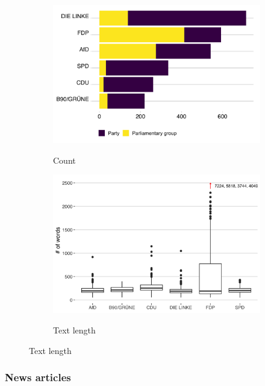 \documentclass[12pt,a4paper,notitlepage]{article}
\begin{document}
\begin{figure}[H]
	\begin{center}
	\caption{Press releases}
		\begin{subfigure}[normla]{0.39\textwidth}
			\caption{Count}
			\includegraphics[width=\textwidth]{../figs/press_releases}
			\label{fig_press}
		\end{subfigure}
		\begin{subfigure}[normla]{0.59\textwidth}
			\caption{Text length}
			\includegraphics[width=\textwidth]{../figs/press_releases_textlength}
			\label{fig_press_textlength}
		\end{subfigure}
	\end{center}
\end{figure}


\subsubsection{News articles}\label{ch_news}
\end{document}
